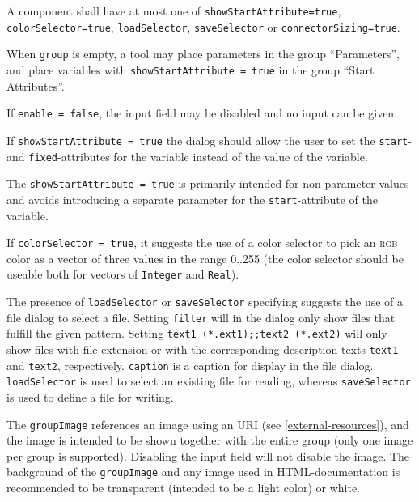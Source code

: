 A component shall have at most one of \lstinline!showStartAttribute=true!, \lstinline!colorSelector=true!, \lstinline!loadSelector!, \lstinline!saveSelector! or \lstinline!connectorSizing=true!.

\begin{example}
When \lstinline!group! is empty, a tool may place parameters in the group ``Parameters'', and place variables with \lstinline!showStartAttribute = true! in the group ``Start Attributes''.
\end{example}

If \lstinline!enable = false!, the input field may be disabled and no input can be given.

If \lstinline!showStartAttribute = true! the dialog should allow the user to set the \lstinline!start!- and \lstinline!fixed!-attributes for the variable instead of the value of the variable.

\begin{nonnormative}
The \lstinline!showStartAttribute = true! is primarily intended for non-parameter values and avoids introducing a separate parameter for the \lstinline!start!-attribute of the variable.
\end{nonnormative}

If \lstinline!colorSelector = true!, it suggests the use of a color selector to pick an \textsc{rgb} color as a vector of three values in the range 0..255 (the color selector should be useable both for vectors of \lstinline!Integer! and \lstinline!Real!).

The presence of \lstinline!loadSelector! or \lstinline!saveSelector! specifying  suggests the use of a file dialog to select a file.
Setting \lstinline!filter! will in the dialog only show files that fulfill the given pattern.
Setting \lstinline!text1 (*.ext1);;text2 (*.ext2)! will only show files with file extension  or  with the corresponding description texts \lstinline!text1! and \lstinline!text2!, respectively.
\lstinline!caption! is a caption for display in the file dialog.
\lstinline!loadSelector! is used to select an existing file for reading, whereas \lstinline!saveSelector! is used to define a file for writing.

The \lstinline!groupImage! references an image using an URI (see \cref{external-resources}), and the image is intended to be shown together with the entire group (only one image per group is supported).
Disabling the input field will not disable the image.
The background of the \lstinline!groupImage! and any image used in HTML-documentation is recommended to be transparent (intended to be a light color) or white.

